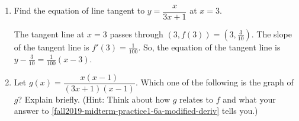 \documentclass{article}
\theoremstyle{theorem}
\begin{document}
\begin{enumerate}
\begin{enumerate}
    \begin{solution}
      \begin{align*}
        f'(3) &= \lim_{h \to 0}\frac{f(3+h)-f(3)}{h} \\
        &= \lim_{h \to 0} \frac{\dfrac{3 + h}{3 (3 + h) + 1} - \dfrac{3}{10}}{h} \\
        &= \lim_{h \to 0} \frac{\dfrac{3 + h}{10 + 3h} - \dfrac{3}{10}}{h} \\
        &= \lim_{h \to 0} \frac{\quad \dfrac{(3 + h) 10 - 3 (10 + 3h)}{(10 + 3h) 10} \quad}{h} \\
        &= \lim_{h \to 0} \frac{30 + 10h - 30 - 9h}{h (10 + 3h) 10 } \\
        &= \lim_{h \to 0} \frac{h}{h(10 + 3h) 10} \\
        \intertext{When we take the limit as $h \to 0$, we're looking only at $h \neq 0$, so we can cancel the $\frac{h}{h}$:} %
        &= \lim_{h \to 0} \frac{1}{(10 + 3h) 10} \\
        \intertext{Now that there's no $h$ in the denominator, we can just plug in $h = 0$ to evaluate the limit:}%
        &= \frac{1}{10^2} \\
        &= \boxed{\frac{1}{100}}
      \end{align*}
    \end{solution}

  \item
    \begin{problem}[\nstretch{0.4}]
      Find the equation of line tangent to $y = \dfrac{x}{3x + 1}$ at $x=3$.
    \end{problem}

    \begin{solution}
      The tangent line at $x=3$ passes through $(3, f(3))= \left(3, \frac{3}{10} \right)$. The slope of the tangent line is $f'(3)=\frac{1}{100}$. So, the equation of the tangent line is $\boxed{y - \frac{3}{10} = \frac{1}{100} (x - 3)}$.
    \end{solution}

  \item %

    \begin{problem}
      Let $g(x) = \dfrac{x (x - 1)}{(3x + 1) (x - 1)}$. Which one of the following is the graph of $g$? Explain briefly. (Hint: Think about how $g$ relates to $f$ and what your answer to \ref{fall2019-midterm-practice1-6a-modified-deriv} tells you.)
    \end{problem}


\end{enumerate}
\end{enumerate}
\end{document}
